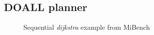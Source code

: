 \subsection{DOALL planner}
\label{planner}


\lstset{basicstyle=\ttfamily, numbers=left, numberstyle=\tiny,
  stepnumber=1, numbersep=5pt}

\begin{figure}[t]
  \centering
  \scriptsize
    \subfloat{
    \begin{minipage}{5cm}
      
    \end{minipage}
%
%
%
%
%
%

}
\caption{Sequential \textit{dijkstra} example from MiBench~\cite{}}
\label{fig:dijkstra_motivation}
\end{figure}

